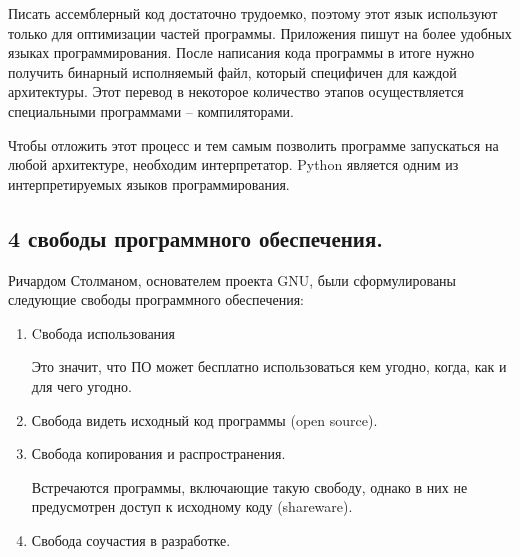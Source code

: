 \documentclass[a4paper, fleqn]{article}
\begin{document}
			Писать ассемблерный код достаточно трудоемко, поэтому этот язык используют только для оптимизации частей программы. Приложения пишут на более удобных языках программирования. После написания кода программы в итоге нужно получить бинарный исполняемый файл, который специфичен для каждой архитектуры. Этот перевод в некоторое количество этапов осуществляется специальными программами – компиляторами. 
			
			Чтобы отложить этот процесс и тем самым позволить программе запускаться на любой архитектуре, необходим интерпретатор.
			Python является одним из интерпретируемых языков программирования.
			
			\subsection*{4 свободы программного обеспечения.}
			
			Ричардом Столманом, основателем проекта GNU, были сформулированы следующие свободы программного обеспечения:
			
			\begin{enumerate}
				\item Cвобода использования
				
				Это значит, что ПО может бесплатно использоваться кем угодно, когда, как и для чего угодно.
				
				\item Свобода видеть исходный код программы (open source).
				
				\item Свобода копирования и распространения.
				
				Встречаются программы, включающие такую свободу, однако в них не предусмотрен доступ к исходному коду (shareware).
				\item Свобода соучастия в разработке.
			\end{enumerate}	
	
\end{document}
